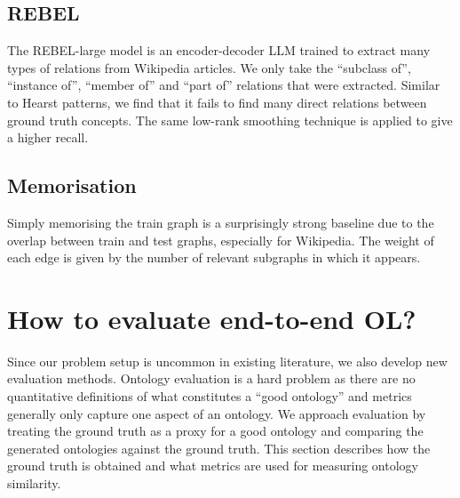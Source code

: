 
\subsection{REBEL}

The REBEL-large model \cite{cabot2021rebel} is an encoder-decoder LLM trained to extract many types of relations from Wikipedia articles. We only take the ``subclass of'', ``instance of'', ``member of'' and ``part of'' relations that were extracted. Similar to Hearst patterns, we find that it fails to find many direct relations between ground truth concepts. The same low-rank smoothing technique is applied to give a higher recall.

\subsection{Memorisation}
Simply memorising the train graph is a surprisingly strong baseline due to the overlap between train and test graphs, especially for Wikipedia. The weight of each edge is given by the number of relevant subgraphs in which it appears.



\section{How to evaluate end-to-end OL?}  \label{sec:implementation:evaluation}

Since our problem setup is uncommon in existing literature, we also develop new evaluation methods. Ontology evaluation is a hard problem as there are no quantitative definitions of what constitutes a ``good ontology'' and metrics generally only capture one aspect of an ontology. We approach evaluation by treating the ground truth as a proxy for a good ontology and comparing the generated ontologies against the ground truth. This section describes how the ground truth is obtained and what metrics are used for measuring ontology similarity.

